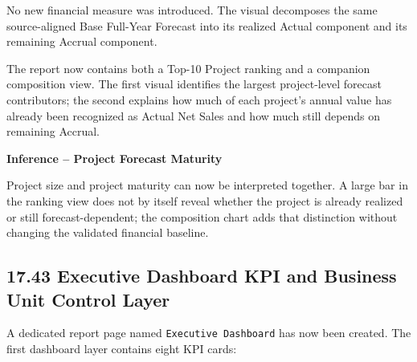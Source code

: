 \documentclass[11pt,a4paper]{article}
\begin{document}
No new financial measure was introduced. The visual decomposes the same
source-aligned Base Full-Year Forecast into its realized Actual component and its
remaining Accrual component.

\begin{successbox}

\textbf{\color{SuccessGreen}{Project Composition Visual Result}}

The report now contains both a Top-10 Project ranking and a companion composition
view. The first visual identifies the largest project-level forecast contributors;
the second explains how much of each project's annual value has already been
recognized as Actual Net Sales and how much still depends on remaining Accrual.

\end{successbox}

\begin{inferencebox}

\textbf{Inference -- Project Forecast Maturity}

Project size and project maturity can now be interpreted together. A large bar in
the ranking view does not by itself reveal whether the project is already realized
or still forecast-dependent; the composition chart adds that distinction without
changing the validated financial baseline.

\end{inferencebox}


\subsection{17.43 Executive Dashboard KPI and Business Unit Control Layer}

A dedicated report page named \texttt{Executive Dashboard} has now been created.
The first dashboard layer contains eight KPI cards:
\end{document}
